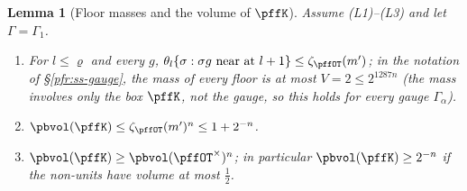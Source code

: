 \documentclass[10pt]{amsart}
\newtheorem{lemma}[theorem]{Lemma}
\theoremstyle{definition}
\theoremstyle{remark}
\begin{document}
\begin{lemma}[Floor masses and the volume of $\pffK$]\label{pff:floormass}
Assume (L1)--(L3) and let $\Gamma=\Gamma_1$.
\begin{enumerate}
\item[(a)] For $l\le\varrho$ and every $g$, $\theta_l\{\sigma:\sigma g\text{ near at }l+1\}\le\zeta_{\pffOT}(m')$;
in the notation of \S\ref{pfr:ss-gauge}, the mass of every floor is at most $V=2\le2^{1287n}$ (the mass involves only
the box $\pffK$, not the gauge, so this holds for every gauge $\Gamma_\alpha$).
\item[(b)] $\pbvol(\pffK)\le\zeta_{\pffOT}(m')^n\le1+2^{-n}$.
\item[(c)] $\pbvol(\pffK)\ge\pbvol(\pffOT^\times)^n$; in particular $\pbvol(\pffK)\ge2^{-n}$ if the
non-units have volume at most $\frac12$.
\end{enumerate}
\end{lemma}
\end{document}
